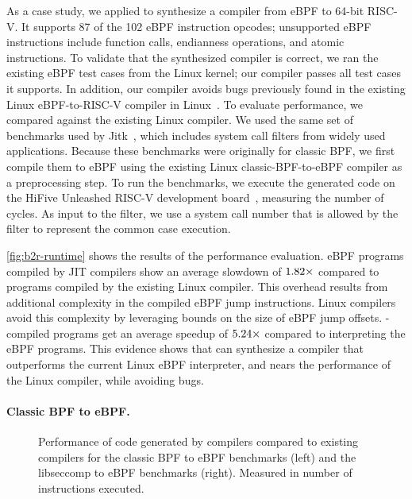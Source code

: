 As a case study, we applied \jitsynth to synthesize
a compiler from eBPF to 64-bit RISC-V.
%
It supports 87 of the 102 eBPF instruction opcodes;
unsupported eBPF instructions include function calls,
endianness operations, and atomic instructions.
%
To validate that the synthesized compiler is correct, we ran the existing
eBPF test cases from the Linux kernel; our compiler passes all test cases
it supports. %
%
In addition, our compiler avoids bugs previously found in the existing
Linux eBPF-to-RISC-V compiler in Linux~\cite{nelson:bpf-riscv-add32-bug}.
%
To evaluate performance, we compared against the existing Linux compiler.
%
We used the same set of benchmarks used by Jitk~\cite{wang:jitk},
which includes system call filters from widely used applications.
%
Because these benchmarks were originally for classic BPF,
we first compile them to eBPF using the existing
Linux classic-BPF-to-eBPF compiler as a preprocessing step.
%
To run the benchmarks, we execute the generated
code on the HiFive Unleashed RISC-V development board~\cite{sifive:fu540-c000}, measuring
the number of cycles.
%
As input to the filter, we use a system call number that is allowed
by the filter to represent the common case execution.


\autoref{fig:b2r-runtime} shows the results of the performance evaluation.
%
eBPF programs compiled by \jitsynth JIT compilers show an average slowdown of $1.82\times$
compared to programs compiled by the existing Linux compiler.
%
This overhead results from additional complexity in the compiled eBPF jump instructions.
%
Linux compilers avoid this complexity by leveraging
bounds on the size of eBPF jump offsets.
%
\jitsynth-compiled programs get an average speedup of $5.24\times$
compared to interpreting the eBPF programs.
%
This evidence shows that \jitsynth can synthesize a compiler that outperforms
the current Linux eBPF interpreter, and nears the performance of the Linux
compiler, while avoiding bugs.
%

\paragraph{Classic BPF to eBPF.}

\begin{figure}[h]
  \resizebox{\textwidth}{!}{
  
  
  }
  \caption{Performance of code generated by \jitsynth compilers
  compared to existing compilers for the classic BPF to eBPF benchmarks
  (left) and the libseccomp to eBPF benchmarks (right). Measured in number
  of instructions executed.}
  \label{fig:o2b-l2b-runtime}
\end{figure}

